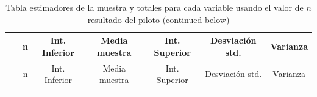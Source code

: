 \documentclass[
]{article}
\begin{document}
\begin{longtable}[]{@{}ccccccc@{}}
\caption{Tabla estimadores de la muestra y totales para cada variable
usando el valor de \(n\) resultado del piloto (continued
below)}\tabularnewline
\toprule
\begin{minipage}[b]{0.23\columnwidth}\centering
~\strut
\end{minipage} & \begin{minipage}[b]{0.06\columnwidth}\centering
n\strut
\end{minipage} & \begin{minipage}[b]{0.10\columnwidth}\centering
Int. Inferior\strut
\end{minipage} & \begin{minipage}[b]{0.09\columnwidth}\centering
Media muestra\strut
\end{minipage} & \begin{minipage}[b]{0.10\columnwidth}\centering
Int. Superior\strut
\end{minipage} & \begin{minipage}[b]{0.11\columnwidth}\centering
Desviación std.\strut
\end{minipage} & \begin{minipage}[b]{0.11\columnwidth}\centering
Varianza\strut
\end{minipage}\tabularnewline
\midrule
\endfirsthead
\toprule
\begin{minipage}[b]{0.23\columnwidth}\centering
~\strut
\end{minipage} & \begin{minipage}[b]{0.06\columnwidth}\centering
n\strut
\end{minipage} & \begin{minipage}[b]{0.10\columnwidth}\centering
Int. Inferior\strut
\end{minipage} & \begin{minipage}[b]{0.09\columnwidth}\centering
Media muestra\strut
\end{minipage} & \begin{minipage}[b]{0.10\columnwidth}\centering
Int. Superior\strut
\end{minipage} & \begin{minipage}[b]{0.11\columnwidth}\centering
Desviación std.\strut
\end{minipage} & \begin{minipage}[b]{0.11\columnwidth}\centering
Varianza\strut
\end{minipage}\tabularnewline
\midrule
\endhead
\begin{minipage}[t]{0.23\columnwidth}\centering

\end{minipage}
\end{longtable}
\end{document}
